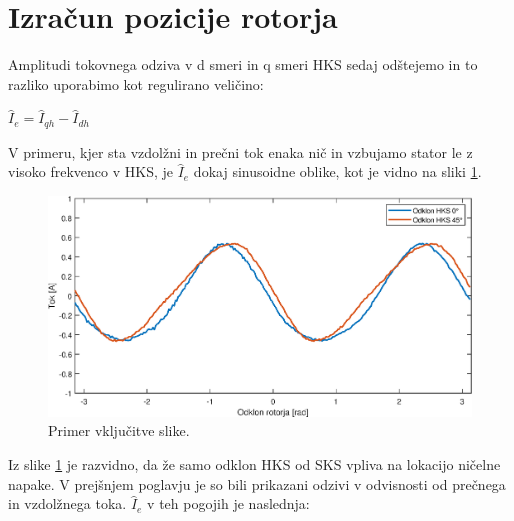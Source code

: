 \documentclass[a4paper,twoside,openright,12pt,slovene]{book}
\begin{document}
%
% 
%


\section{Izračun pozicije rotorja}

Amplitudi tokovnega odziva v d smeri in q smeri HKS sedaj odštejemo in to razliko uporabimo kot regulirano veličino:

\begin{center}
    $\hat{I}_{e} = \hat{I}_{qh} - \hat{I}_{dh}$
\end{center}

V primeru, kjer sta vzdolžni in prečni tok enaka nič in vzbujamo stator le z visoko frekvenco v HKS, je $\hat{I}_{e}$ dokaj sinusoidne oblike, kot je vidno na sliki \ref{reguliranaVelicinaIdq0}.

\begin{figure}[!htbp]
    \centering
    \includegraphics[width=1\columnwidth]{Slike/reguliranaVelicinaIdq0.eps}
    \caption{\label{reguliranaVelicinaIdq0} Primer vključitve slike.}
\end{figure}

Iz slike \ref{reguliranaVelicinaIdq0} je razvidno, da že samo odklon HKS od SKS vpliva na lokacijo ničelne napake. V prejšnjem poglavju je so bili prikazani odzivi v odvisnosti od prečnega in
vzdolžnega toka. $\hat{I}_{e}$ v teh pogojih je naslednja:
\end{document}
